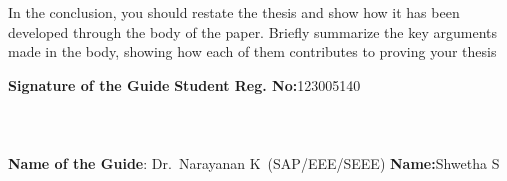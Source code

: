 	In the conclusion, you should restate the thesis and show how it has been developed through the body of the paper. Briefly summarize the key arguments made in the body, showing how each of them contributes to proving your thesis
	
	\vspace*{24pt}
	
		\noindent \textbf{Signature of the Guide} \hspace*{71mm} \textbf{Student Reg. No:}123005140\\
			\\
		\\
		\\
	\noindent \textbf{Name of the Guide}:{ Dr.~Narayanan K}~(SAP/EEE/SEEE) \hspace*{15mm} \textbf{Name:}Shwetha S
	\pagebreak
	\pagebreak
	
	
